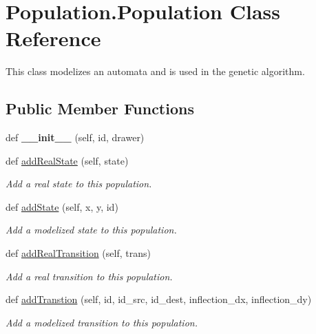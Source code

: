 \hypertarget{classPopulation_1_1Population}{}\section{Population.\+Population Class Reference}
\label{classPopulation_1_1Population}


This class modelizes an automata and is used in the genetic algorithm.  


\subsection*{Public Member Functions}
\begin{DoxyCompactItemize}
\item 
\mbox{\label{classPopulation_1_1Population_a19326623f1e5aac6d2a6b6558d39f9e2}} 
def {\bfseries \+\_\+\+\_\+init\+\_\+\+\_\+} (self, id, drawer)
\item 
def \mbox{\hyperlink{classPopulation_1_1Population_a8c399aa1a35a6a1381bbe9027c6ed289}{add\+Real\+State}} (self, state)
\begin{DoxyCompactList}\small\item\em Add a real state to this population. \end{DoxyCompactList}\item 
def \mbox{\hyperlink{classPopulation_1_1Population_abac8ca83fe88481ceac9b60f20e21df3}{add\+State}} (self, x, y, id)
\begin{DoxyCompactList}\small\item\em Add a modelized state to this population. \end{DoxyCompactList}\item 
def \mbox{\hyperlink{classPopulation_1_1Population_aa68445393621fc0ec8713f533c959d02}{add\+Real\+Transition}} (self, trans)
\begin{DoxyCompactList}\small\item\em Add a real transition to this population. \end{DoxyCompactList}\item 
def \mbox{\hyperlink{classPopulation_1_1Population_a21503345e1235d9fe7fbb29331f2b1a5}{add\+Transtion}} (self, id, id\+\_\+src, id\+\_\+dest, inflection\+\_\+dx, inflection\+\_\+dy)
\begin{DoxyCompactList}\small\item\em Add a modelized transition to this population. \end{DoxyCompactList}\item 

\end{DoxyCompactItemize}
